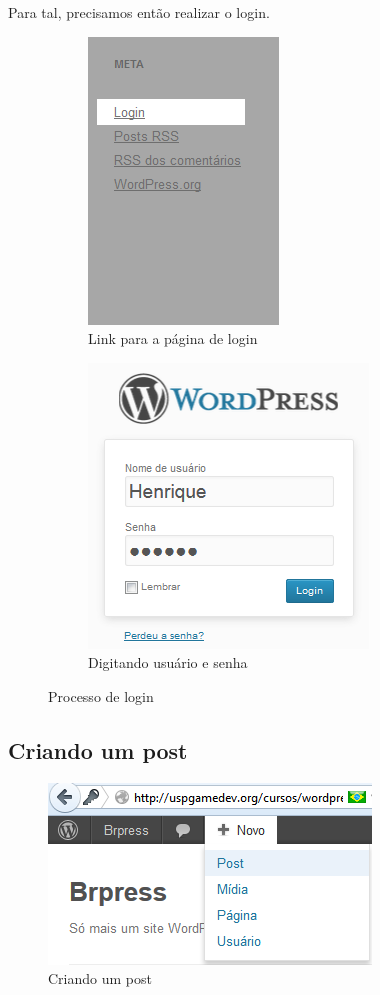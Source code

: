 \documentclass[12pt,onecolumn]{article}
\begin{document}
		Para tal, precisamos então realizar o login.
		\begin{figure}[H]
			\begin{subfigure}{.4\textwidth}
				\centering
				\includegraphics{login1.png}
				\caption{Link para a página de login}
			\end{subfigure}
			\begin{subfigure}{.4\textwidth}
				\centering
				\includegraphics{login2.png}
				\caption{Digitando usuário e senha}
			\end{subfigure}
			\caption{Processo de login}
		\end{figure}
	
	\subsection{Criando um post}
		\begin{figure}[H]
			\centering
			\includegraphics{post1.png}
			\caption{Criando um post}
		\end{figure}
		
\end{document}
